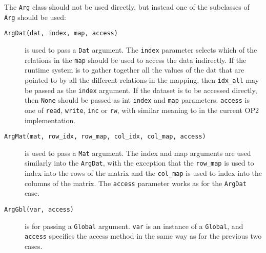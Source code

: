 \documentclass[a4paper]{article}
\begin{document}
The \verb|Arg| class should not be used directly, but instead one of the subclasses of \verb|Arg| should be used:

\begin{description}
  \item[\texttt{ArgDat(dat, index, map, access)}] is used to pass a \verb|Dat| argument. The \verb|index| parameter selects which of the relations in the \verb|map| should be used to access the data indirectly. If the runtime system is to gather together all the values of the dat that are pointed to by all the different relations in the mapping, then \verb|idx_all| may be passed as the \verb|index| argument. If the dataset is to be accessed directly, then \verb|None| should be passed as int \verb|index| and \verb|map| parameters. \verb|access| is one of \verb|read|, \verb|write|, \verb|inc| or \verb|rw|, with similar meaning to in the current OP2 implementation.
  \item[\texttt{ArgMat(mat, row\_idx, row\_map, col\_idx, col\_map, access)}] is used to pass a \verb|Mat| argument. The index and map arguments are used similarly into the \verb|ArgDat|, with the exception that the \verb|row_map| is used to index into the rows of the matrix and the \verb|col_map| is used to index into the columns of the matrix. The \verb|access| parameter works as for the \verb|ArgDat| case.
  \item[\texttt{ArgGbl(var, access)}] is for passing a \verb|Global| argument. \verb|var| is an instance of a \verb|Global|, and \verb|access| specifies the access method in the same way as for the previous two cases.
\end{description}
\end{document}
